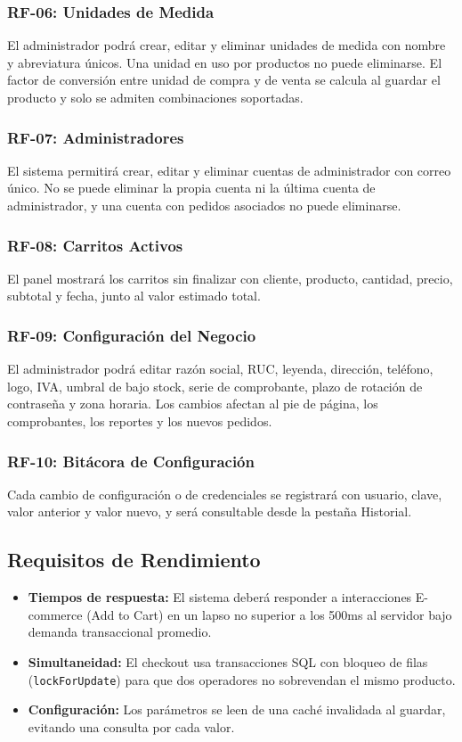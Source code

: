 \documentclass[12pt, a4paper]{article}
\begin{document}
\subsubsection{RF-06: Unidades de Medida}
El administrador podrá crear, editar y eliminar unidades de medida con nombre y abreviatura únicos. Una unidad en uso por productos no puede eliminarse. El factor de conversión entre unidad de compra y de venta se calcula al guardar el producto y solo se admiten combinaciones soportadas.

\subsubsection{RF-07: Administradores}
El sistema permitirá crear, editar y eliminar cuentas de administrador con correo único. No se puede eliminar la propia cuenta ni la última cuenta de administrador, y una cuenta con pedidos asociados no puede eliminarse.

\subsubsection{RF-08: Carritos Activos}
El panel mostrará los carritos sin finalizar con cliente, producto, cantidad, precio, subtotal y fecha, junto al valor estimado total.

\subsubsection{RF-09: Configuración del Negocio}
El administrador podrá editar razón social, RUC, leyenda, dirección, teléfono, logo, IVA, umbral de bajo stock, serie de comprobante, plazo de rotación de contraseña y zona horaria. Los cambios afectan al pie de página, los comprobantes, los reportes y los nuevos pedidos.

\subsubsection{RF-10: Bitácora de Configuración}
Cada cambio de configuración o de credenciales se registrará con usuario, clave, valor anterior y valor nuevo, y será consultable desde la pestaña Historial.

\subsection{Requisitos de Rendimiento}
\begin{itemize}
    \item \textbf{Tiempos de respuesta:} El sistema deberá responder a interacciones E-commerce (Add to Cart) en un lapso no superior a los 500ms al servidor bajo demanda transaccional promedio.
    \item \textbf{Simultaneidad:} El checkout usa transacciones SQL con bloqueo de filas (\texttt{lockForUpdate}) para que dos operadores no sobrevendan el mismo producto.
    \item \textbf{Configuración:} Los parámetros se leen de una caché invalidada al guardar, evitando una consulta por cada valor.
\end{itemize}
\end{document}
